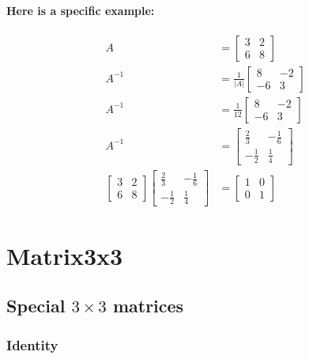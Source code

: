 \documentclass[twoside]{article}
\begin{document}
\paragraph{Here is a specific example:}

\begin{align*}
  A & = \left[ \begin{array}{rr}
    3 & 2 \\
    6 & 8 
    \end{array} \right] \\
  A^{-1} & = \frac{1}{|A|} \left[ \begin{array}{rr}
    8 & -2 \\
    -6 & 3
    \end{array} \right] \\
  A^{-1} & = \frac{1}{12} \left[ \begin{array}{rr}
    8 & -2 \\
    -6 & 3
    \end{array} \right] \\
  A^{-1} & = \left[ \begin{array}{rr}
    \frac{2}{3} & -\frac{1}{6} \\
    -\frac{1}{2} & \frac{1}{4}
    \end{array} \right] \\
  \left[ \begin{array}{rr}
    3 & 2 \\
    6 & 8 
    \end{array} \right] 
  \left[ \begin{array}{rr}
    \frac{2}{3} & -\frac{1}{6} \\
    -\frac{1}{2} & \frac{1}{4}
    \end{array} \right] & =
  \left[ \begin{array}{rr}
    1 & 0 \\
    0 & 1
    \end{array} \right]
  \end{align*}

\section{Matrix3x3}

\subsection{Special $3 \times 3$ matrices}

\subsubsection{Identity}
\end{document}

